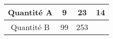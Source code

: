 \begin{tabular}{|c|c|c|c|}
\hline
Quantité A & 9 & 23 & 14 \\ \hline
Quantité B & 99 & 253 & \kern1cm \\ \hline
\end{tabular}

